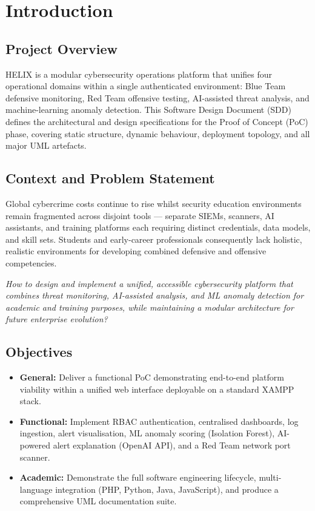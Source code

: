 \documentclass[12pt,a4paper]{article}
\begin{document}
\tableofcontents
\newpage

\section{Introduction}

\subsection{Project Overview}
HELIX is a modular cybersecurity operations platform that unifies four operational
domains within a single authenticated environment: Blue Team defensive monitoring,
Red Team offensive testing, AI-assisted threat analysis, and machine-learning anomaly
detection. This Software Design Document (SDD) defines the architectural and design
specifications for the Proof of Concept (PoC) phase, covering static structure,
dynamic behaviour, deployment topology, and all major UML artefacts.

\subsection{Context and Problem Statement}
Global cybercrime costs continue to rise whilst security education environments
remain fragmented across disjoint tools --- separate SIEMs, scanners, AI assistants,
and training platforms each requiring distinct credentials, data models, and skill sets.
Students and early-career professionals consequently lack holistic, realistic environments
for developing combined defensive and offensive competencies.

\textit{How to design and implement a unified, accessible cybersecurity platform that
combines threat monitoring, AI-assisted analysis, and ML anomaly detection for academic
and training purposes, while maintaining a modular architecture for future enterprise
evolution?}

\subsection{Objectives}
\begin{itemize}[leftmargin=*,itemsep=2pt]
  \item \textbf{General:} Deliver a functional PoC demonstrating end-to-end platform
    viability within a unified web interface deployable on a standard XAMPP stack.
  \item \textbf{Functional:} Implement RBAC authentication, centralised dashboards,
    log ingestion, alert visualisation, ML anomaly scoring (Isolation Forest), AI-powered
    alert explanation (OpenAI API), and a Red Team network port scanner.
  \item \textbf{Academic:} Demonstrate the full software engineering lifecycle,
    multi-language integration (PHP, Python, Java, JavaScript), and produce a
    comprehensive UML documentation suite.
\end{itemize}
\end{document}
